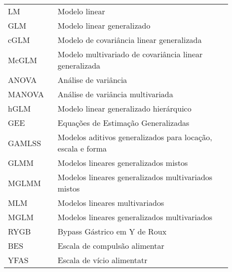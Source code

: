 

\begin{listaacron}

\begin{longtable}[l]{p{0.2\linewidth}p{0.7\linewidth}}

LM & Modelo linear\\
GLM & Modelo linear generalizado\\
cGLM & Modelo de covariância linear generalizada\\
McGLM & Modelo multivariado de covariância linear generalizada\\
ANOVA & Análise de variância\\
MANOVA & Análise de variância multivariada\\
hGLM & Modelo linear generalizado hierárquico\\
GEE & Equações de Estimação Generalizadas\\
GAMLSS & Modelos aditivos generalizados para locação, escala e forma\\
GLMM & Modelos lineares generalizados mistos\\
MGLMM & Modelos lineares generalizados multivariados mistos\\
MLM & Modelos lineares multivariados\\
MGLM & Modelos lineares generalizados multivariados\\
RYGB & Bypass Gástrico em Y de Roux\\
BES & Escala de compulsão alimentar\\
YFAS & Escala de vício alimentatr\\


\end{longtable}

\end{listaacron}

